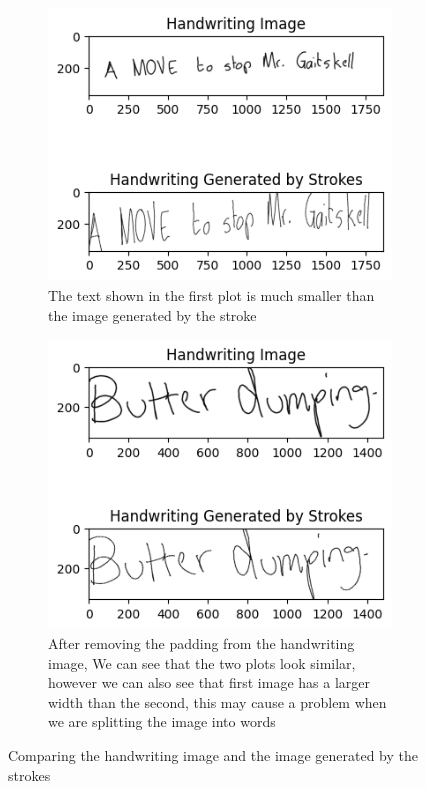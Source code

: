 \documentclass[10pt,twocolumn,letterpaper]{article}
\begin{document}
\begin{figure}[h]
  \centering
  \begin{subfigure}[t]{0.23\textwidth}  %
    \includegraphics[width=\textwidth]{latex-src/Images/ImagevsStroke.png}
    \caption{The text shown in the first plot is much smaller than the image generated by the stroke}
    \label{fig:first_image}
  \end{subfigure}
  \hfill
  \begin{subfigure}[t]{0.23\textwidth}  %
    \includegraphics[width=\textwidth]{latex-src/Images/Padding_ImagevsStroke.png}
    \caption{After removing the padding from the handwriting image, We can see that the two plots look similar, however we can also see that first image has a larger width than the second, this may cause a problem when we are splitting the image into words}
    \label{fig:second_image}
  \end{subfigure}
  \caption{Comparing the handwriting image and the image generated by the strokes}
  \label{fig:whole_figure}
\end{figure}
\end{document}
